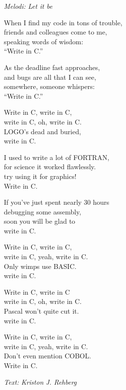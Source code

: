 {\footnotesize\textit{Melodi: Let it be}}\par
\vspace{10pt}
When I find my code in tons of trouble,\\
friends and colleagues come to me,\\
speaking words of wisdom:\\
``Write in C.''\par
\vspace{10pt}
As the deadline fast approaches,\\
and bugs are all that I can see,\\
somewhere, someone whispers:\\
``Write in C.''\par
\vspace{10pt}
Write in C, write in C,\\
write in C, oh, write in C.\\
LOGO's dead and buried,\\
write in C.\par
\vspace{10pt}
I used to write a lot of FORTRAN,\\
for science it worked flawlessly.\\
try using it for graphics!\\
Write in C.\par
\vspace{10pt}
If you've just spent nearly 30 hours\\
debugging some assembly,\\
soon you will be glad to\\
write in C.\par
\newpage
Write in C, write in C,\\
write in C, yeah, write in C.\\
Only wimps use BASIC.\\
write in C.\par
\vspace{10pt}
Write in C, write in C \\
write in C, oh, write in C.\\
Pascal won't quite cut it.\\
write in C.\par
\vspace{10pt}
Write in C, write in C,\\
write in C, yeah, write in C.\\
Don't even mention COBOL.\\
Write in C.\par
\vspace{10pt}
{\footnotesize\textit{Text: Kriston J. Rehberg}}
